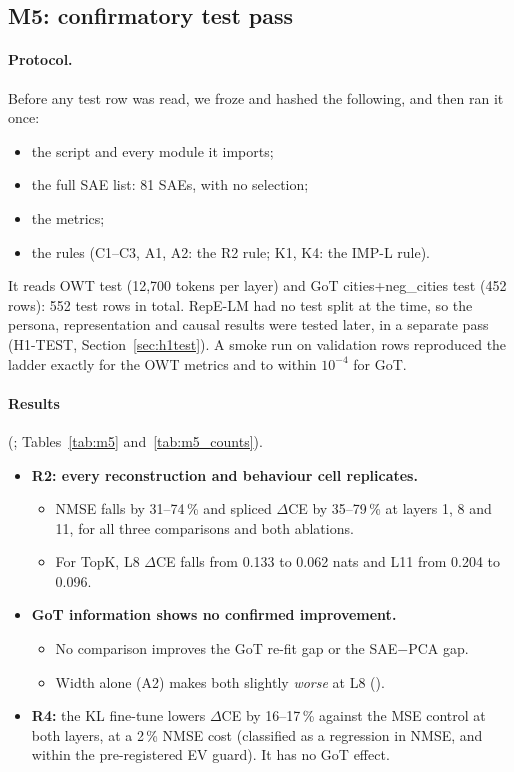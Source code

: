 

\subsection{M5: confirmatory test pass}\label{sec:m5}

\paragraph{Protocol.} Before any test row was read, we froze and hashed the following, and then ran it once:
\begin{itemize}
\item the script and every module it imports;
\item the full SAE list: 81 SAEs, with no selection;
\item the metrics;
\item the rules (C1--C3, A1, A2: the R2 rule; K1, K4: the IMP-L rule).
\end{itemize}
It reads OWT test (12,700 tokens per layer) and GoT cities+neg\_cities test (452 rows): 552 test rows in total.
RepE-LM had no test split at the time, so the persona, representation and causal results were tested later, in a
separate pass (H1-TEST, Section~\ref{sec:h1test}). A smoke run
on validation rows reproduced the ladder exactly for the OWT metrics and to within $10^{-4}$ for GoT.

\paragraph{Results} (; Tables~\ref{tab:m5} and~\ref{tab:m5_counts}).
\begin{itemize}
\item \textbf{R2: every reconstruction and behaviour cell replicates.}
  \begin{itemize}
  \item NMSE falls by 31--74\,\% and spliced $\Delta$CE by 35--79\,\% at layers 1, 8 and 11, for all three
    comparisons and both ablations.
  \item For TopK, L8 $\Delta$CE falls from 0.133 to 0.062 nats and L11 from 0.204 to 0.096.
  \end{itemize}
\item \textbf{GoT information shows no confirmed improvement.}
  \begin{itemize}
  \item No comparison improves the GoT re-fit gap or the SAE$-$PCA gap.
  \item Width alone (A2) makes both slightly \emph{worse} at L8 ().
  \end{itemize}
\item \textbf{R4:} the KL fine-tune lowers $\Delta$CE by 16--17\,\% against the MSE control at both layers, at a
  2\,\% NMSE cost (classified as a regression in NMSE, and within the pre-registered EV guard). It has no GoT effect.
\end{itemize}

